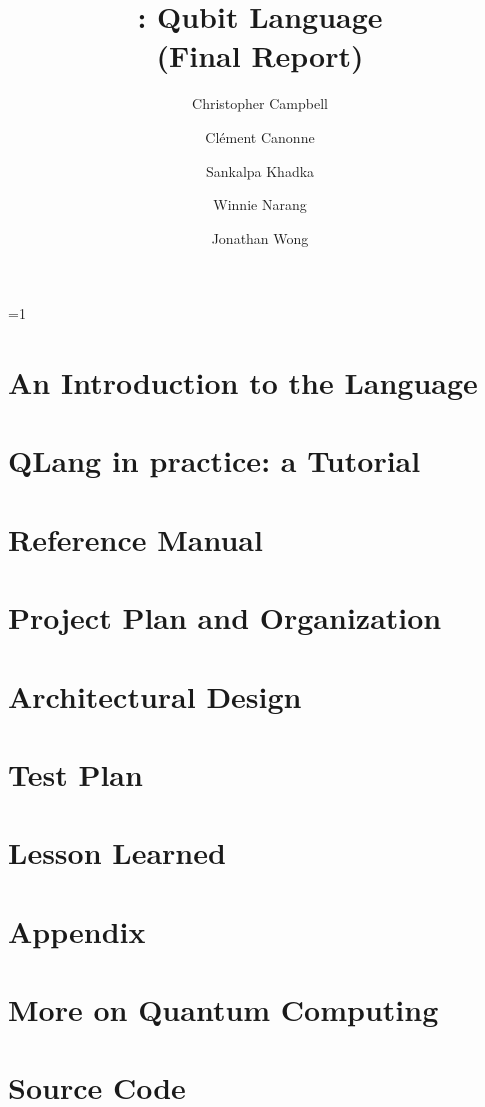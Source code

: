 \documentclass[11pt]{report}
\title{\QL: Qubit Language\\ \Large(Final Report)}
\author{
  Christopher Campbell
  \and Cl\'ement Canonne
  \and Sankalpa Khadka
  \and Winnie Narang
  \and Jonathan Wong
}
\def\withnotes{1}
\newcommand{\QL}{\textsf{QLang}\xspace}
\begin{document}
\maketitle
\tableofcontents

\ifnum\withnotes=1
  \listoftodos
\fi

\chapter{An Introduction to the Language}
  
\chapter{\QL in practice: a Tutorial}
  
\chapter{Reference Manual}\label{sec:reference}
  
\chapter{Project Plan and Organization}
\chapter{Architectural Design}
  
\chapter{Test Plan}
  
\chapter{Lesson Learned}
  
\chapter{Appendix}
\appendix
\chapter{More on Quantum Computing}\label{app:quantum:more}
  
\chapter{Source Code}
\end{document}
